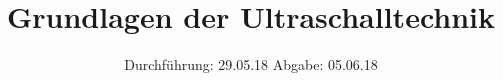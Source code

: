 
\setlength{\parindent}{0 pt}

\subject{US1}
\title{Grundlagen der Ultraschalltechnik}
\date{%
  Durchführung: 29.05.18
  \hspace{3em}
  Abgabe: 05.06.18
}



\maketitle
\thispagestyle{empty}
\tableofcontents
\newpage






\printbibliography{}


